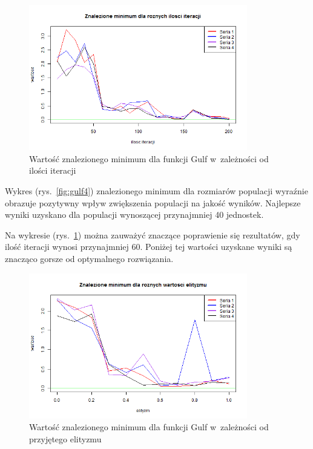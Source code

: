 \documentclass[11pt, a4paper]{article}
\newcommand{\fbi}{\leavevmode{\parindent=1em\indent}}
\begin{document}
\begin{figure}[H]
	\begin{center}
		\includegraphics[width=0.85\textwidth]{./assets/Gulf5.png} 
		\caption{Wartość znalezionego minimum dla funkcji Gulf w~zależności od ilości iteracji}
		\label{fig:gulf5}
	\end{center}
\end{figure}

\fbi
Wykres (rys.~\ref{fig:gulf4}) znalezionego minimum dla rozmiarów populacji wyraźnie obrazuje pozytywny wpływ zwiększenia populacji na jakość wyników. Najlepsze wyniki uzyskano dla populacji wynoszącej przynajmniej 40 jednostek.

\fbi
Na wykresie (rys.~\ref{fig:gulf5}) można zauważyć znaczące poprawienie się rezultatów, gdy ilość iteracji wynosi przynajmniej 60. Poniżej tej wartości uzyskane wyniki są znacząco gorsze od optymalnego rozwiązania. 

\begin{figure}[H]
	\begin{center}
		\includegraphics[width=0.85\textwidth]{./assets/Gulf6.png}
		\caption{Wartość znalezionego minimum dla funkcji Gulf w~zależności od przyjętego elityzmu}
		\label{fig:gulf6}
	\end{center}
\end{figure}
\end{document}
